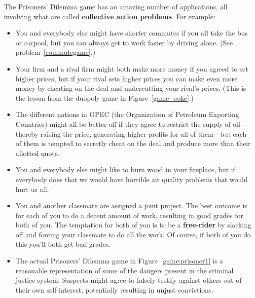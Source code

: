 The Prisoners' Dilemma game has an amazing number of applications, all involving what are called \textbf{collective action problems}. For example:

\begin{itemize}

\item You and everybody else might have shorter commutes if you all take the bus or carpool, but you can always get to work faster by driving alone. (See problem~\ref{commutegame}.)

\item Your firm and a rival firm might both make more money if you agreed to set higher prices, but if your rival sets higher prices you can make even more money by cheating on the deal and undercutting your rival's prices. (This is the lesson from the duopoly game in Figure~\ref{game_coke}.)

\item The different nations in OPEC (the Organization of Petroleum Exporting Countries) might all be better off if they agree to restrict the supply of oil---thereby raising the price, generating higher profits for all of them---but each of them is tempted to secretly cheat on the deal and produce more than their allotted quota.

\item You and everybody else might like to burn wood in your fireplace, but if everybody does that we would have horrible air quality problems that would hurt us all.


\item You and another classmate are assigned a joint project. The best outcome is for each of you to do a decent amount of work, resulting in good grades for both of you. The temptation for both of you is to be a \textbf{free-rider} by slacking off and forcing your classmate to do all the work. Of course, if both of you do this you'll both get bad grades.


\item The actual Prisoners' Dilemma game in Figure~\ref{game:prisoner1} is a reasonable representation of some of the dangers present in the criminal justice system. Suspects might agree to falsely testify against others out of their own self-interest, potentially resulting in unjust convictions.

\end{itemize}



